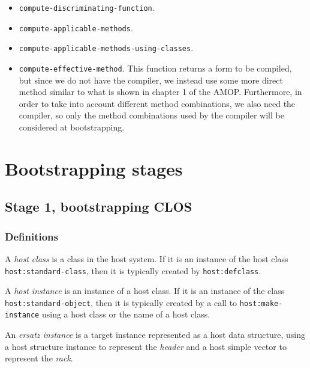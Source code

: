 \begin{itemize}
\item \texttt{compute-discriminating-function}.
\item \texttt{compute-applicable-methods}.
\item \texttt{compute-applicable-methods-using-classes}.
\item \texttt{compute-effective-method}.  This function returns a form
  to be compiled, but since we do not have the compiler, we instead
  use some more direct method similar to what is shown in chapter 1 of
  the AMOP.  Furthermore, in order to take into account different
  method combinations, we also need the compiler, so only the method
  combinations used by the compiler will be considered at
  bootstrapping.
\end{itemize}

\section{Bootstrapping stages}

\subsection{Stage 1, bootstrapping CLOS}

\subsubsection{Definitions}

\begin{definition}
A \emph{host class} is a class in the host system.  If it is an
instance of the host class \texttt{host:standard-class}, then it is
typically created by \texttt{host:defclass}.
\end{definition}

\begin{definition}
A \emph{host instance} is an instance of a host class.  If it is an
instance of the class \texttt{host:standard-object}, then it is
typically created by a call to \texttt{host:make-instance} using a
host class or the name of a host class.
\end{definition}

\begin{definition}
An \emph{ersatz instance} is a target instance represented as a host
data structure, using a host structure instance to represent the
\emph{header} and a host simple vector to represent the \emph{rack}.
\end{definition}


